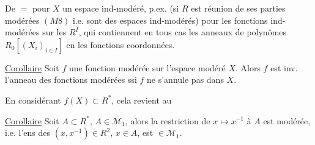 De $=$ pour $X$ un espace ind-modéré, p.ex. (si $R$ est réunion de ses parties modérées $(M8)$ i.e.  sont des espaces ind-modérés) pour les fonctions ind-modérées sur les $R^I$, qui contiennent en tous cas les  anneaux de polynômes $R_0[(X_i)_{i\in I}]$ en les fonctions coordonnées.


\uline{Corollaire} Soit $f$ une fonction modérée sur l'espace modéré $X$. Alors $f$ est inv.  l'anneau des fonctions modérées ssi $f$ ne s'annule pas dans $X$.

En considérant $f(X)\subset R^*$, cela revient au

\uline{Corollaire} Soit $A\subset R^*$, $A\in\mathcal M_1$, alors la restriction de $x\mapsto x^{-1}$ à $A$ est modérée, i.e. l'ens des $(x,x^{-1})\in R^2$, $x\in A$, est $\in\mathcal M_1$.
